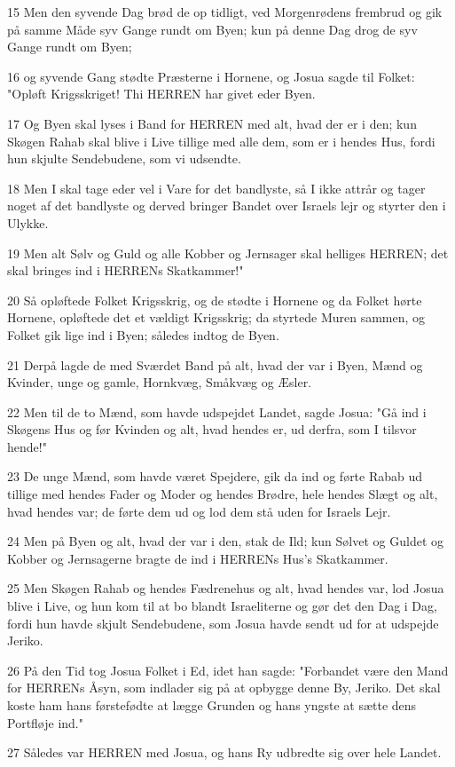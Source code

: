 \par 15 Men den syvende Dag brød de op tidligt, ved Morgenrødens frembrud og gik på samme Måde syv Gange rundt om Byen; kun på denne Dag drog de syv Gange rundt om Byen;
\par 16 og syvende Gang stødte Præsterne i Hornene, og Josua sagde til Folket: "Opløft Krigsskriget! Thi HERREN har givet eder Byen.
\par 17 Og Byen skal lyses i Band for HERREN med alt, hvad der er i den; kun Skøgen Rahab skal blive i Live tillige med alle dem, som er i hendes Hus, fordi hun skjulte Sendebudene, som vi udsendte.
\par 18 Men I skal tage eder vel i Vare for det bandlyste, så I ikke attrår og tager noget af det bandlyste og derved bringer Bandet over Israels lejr og styrter den i Ulykke.
\par 19 Men alt Sølv og Guld og alle Kobber og Jernsager skal helliges HERREN; det skal bringes ind i HERRENs Skatkammer!"
\par 20 Så opløftede Folket Krigsskrig, og de stødte i Hornene og da Folket hørte Hornene, opløftede det et vældigt Krigsskrig; da styrtede Muren sammen, og Folket gik lige ind i Byen; således indtog de Byen.
\par 21 Derpå lagde de med Sværdet Band på alt, hvad der var i Byen, Mænd og Kvinder, unge og gamle, Hornkvæg, Småkvæg og Æsler.
\par 22 Men til de to Mænd, som havde udspejdet Landet, sagde Josua: "Gå ind i Skøgens Hus og før Kvinden og alt, hvad hendes er, ud derfra, som I tilsvor hende!"
\par 23 De unge Mænd, som havde været Spejdere, gik da ind og førte Rabab ud tillige med hendes Fader og Moder og hendes Brødre, hele hendes Slægt og alt, hvad hendes var; de førte dem ud og lod dem stå uden for Israels Lejr.
\par 24 Men på Byen og alt, hvad der var i den, stak de Ild; kun Sølvet og Guldet og Kobber og Jernsagerne bragte de ind i HERRENs Hus's Skatkammer.
\par 25 Men Skøgen Rahab og hendes Fædrenehus og alt, hvad hendes var, lod Josua blive i Live, og hun kom til at bo blandt Israeliterne og gør det den Dag i Dag, fordi hun havde skjult Sendebudene, som Josua havde sendt ud for at udspejde Jeriko.
\par 26 På den Tid tog Josua Folket i Ed, idet han sagde: "Forbandet være den Mand for HERRENs Åsyn, som indlader sig på at opbygge denne By, Jeriko. Det skal koste ham hans førstefødte at lægge Grunden og hans yngste at sætte dens Portfløje ind."
\par 27 Således var HERREN med Josua, og hans Ry udbredte sig over hele Landet.

